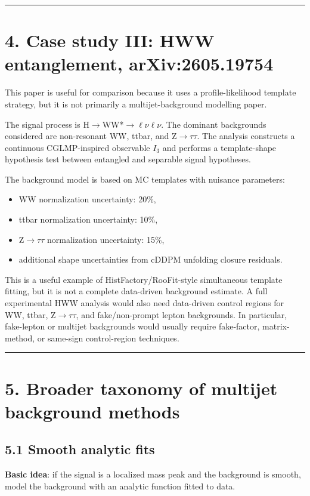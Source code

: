 \documentclass[11pt]{article}
\begin{document}
\bigskip\hrule\bigskip

\section{4. Case study III: HWW entanglement, arXiv:2605.19754}

This paper is useful for comparison because it uses a profile-likelihood template strategy, but it is not primarily a multijet-background modelling paper.

The signal process is H$\to$WW*$\to$$\ell$$\nu$$\ell$$\nu$. The dominant backgrounds considered are non-resonant WW, ttbar, and Z$\to$$\tau$$\tau$. The analysis constructs a continuous CGLMP-inspired observable \(I_3\) and performs a template-shape hypothesis test between entangled and separable signal hypotheses.

The background model is based on MC templates with nuisance parameters:

\begin{itemize}
\item WW normalization uncertainty: 20\%,
\item ttbar normalization uncertainty: 10\%,
\item Z$\to$$\tau$$\tau$ normalization uncertainty: 15\%,
\item additional shape uncertainties from cDDPM unfolding closure residuals.
\end{itemize}

This is a useful example of HistFactory/RooFit-style simultaneous template fitting, but it is not a complete data-driven background estimate. A full experimental HWW analysis would also need data-driven control regions for WW, ttbar, Z$\to$$\tau$$\tau$, and fake/non-prompt lepton backgrounds. In particular, fake-lepton or multijet backgrounds would usually require fake-factor, matrix-method, or same-sign control-region techniques.

\bigskip\hrule\bigskip

\section{5. Broader taxonomy of multijet background methods}

\subsection{5.1 Smooth analytic fits}

\textbf{Basic idea}: if the signal is a localized mass peak and the background is smooth, model the background with an analytic function fitted to data.
\end{document}

